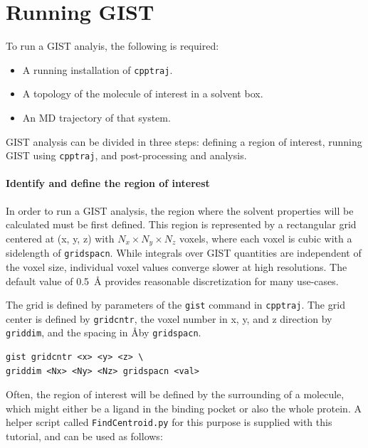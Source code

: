 \documentclass[9pt,tutorial]{livecoms}
\newcommand{\software}{\texttt}
\newcommand\inlinecode{\texttt}
\begin{document}
\section{Running GIST}
To run a GIST analyis, the following is required:
\begin{itemize}
	\item A running installation of \software{cpptraj}.
	\item A topology of the molecule of interest in a solvent box.
	\item An MD trajectory of that system.
\end{itemize}
GIST analysis can be divided in three steps: defining a region of interest, running GIST using \software{cpptraj}, and post-processing and analysis.
\cite{Ramsey2016}

\paragraph{Identify and define the region of interest}
In order to run a GIST analysis, the region where the solvent properties will be calculated must be first defined. This region is represented by a rectangular grid centered at (x, y, z) with $N_x \times N_y \times N_z$ voxels, where each voxel is cubic with a sidelength of \inlinecode{gridspacn}.
While integrals over GIST quantities are independent of the voxel size, individual voxel values converge slower at high resolutions.
The default value of \SI{0.5}{\angstrom} provides reasonable discretization for many use-cases.

The grid is defined by parameters of the \inlinecode{gist} command in \software{cpptraj}.
The grid center is defined by \inlinecode{gridcntr}, the voxel number in x, y, and z direction by \inlinecode{griddim}, and the spacing in \AA by \inlinecode{gridspacn}.

\begin{lstlisting}[style=cpptraj]
gist gridcntr <x> <y> <z> \
griddim <Nx> <Ny> <Nz> gridspacn <val>
\end{lstlisting}

Often, the region of interest will be defined by the surrounding of a molecule, which might either be a ligand in the binding pocket or also the whole protein. 
A helper script called \inlinecode{FindCentroid.py} for this purpose is supplied with this tutorial, and can be used as follows:
\end{document}
